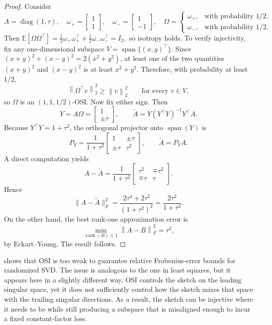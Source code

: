 \documentclass[onefignum,onetabnum]{siamart251216}
\newcommand{\E}{\mathbb{E}}
\newcommand{\norm}[1]{\left\lVert #1 \right\rVert}
\newcommand{\diag}{\operatorname{diag}}
\newcommand{\rank}{\operatorname{rank}}
\begin{document}
\begin{proof}
Consider
\[
A = \diag(1,\tau),
\quad
\omega_+ = \begin{bmatrix}1\\1\end{bmatrix},
\quad
\omega_- = \begin{bmatrix}1\\-1\end{bmatrix},
\quad
\Omega=
\begin{cases}
\omega_+, & \text{with probability } 1/2,\\
\omega_-, & \text{with probability } 1/2.
\end{cases}
\]
Then
$
\E[\Omega\Omega^\top] = \tfrac12\omega_+\omega_+^\top + \tfrac12\omega_-\omega_-^\top = I_2,
$
so isotropy holds. To verify injectivity, fix any one-dimensional subspace $V=\operatorname{span}\{(x,y)^\top\}$. Since $(x+y)^2 + (x-y)^2 = 2(x^2+y^2)$, at least one of the two quantities $(x+y)^2$ and $(x-y)^2$ is at least $x^2+y^2$. Therefore, with probability at least $1/2$,
\[
\norm{\Omega^\top v}_2^2 \ge \norm{v}_2^2
\qquad \text{for every } v\in V,
\]
so $\Omega$ is an $(1,1,1/2)$-OSI.  Now fix either sign. Then
\[
Y = A\Omega = \begin{bmatrix}1\\ \pm \tau\end{bmatrix},
\qquad
\widetilde A = Y(Y^\top Y)^{-1}Y^\top A.
\]
Because $Y^\top Y = 1+\tau^2$, the orthogonal projector onto $\operatorname{span}(Y)$ is
\[
P_Y = \frac{1}{1+\tau^2}
\begin{bmatrix}
1 & \pm \tau\\
\pm \tau & \tau^2
\end{bmatrix},
\qquad
\widetilde A = P_YA.
\]
A direct computation yields
\[
A-\widetilde A
=
\frac{1}{1+\tau^2}
\begin{bmatrix}
\tau^2 & \mp \tau^2\\
\mp \tau & \tau
\end{bmatrix}.
\]
Hence
\[
\|A-\widetilde A\|_F^2
=
\frac{2\tau^4+2\tau^2}{(1+\tau^2)^2}
=
\frac{2\tau^2}{1+\tau^2}.
\]
On the other hand, the best rank-one approximation error is
\[
\min_{\rank(B)\le 1}\norm{A-B}_F^2 = \tau^2,
\]
by Eckart--Young.  The result follows.
\end{proof}

 shows that OSI is too weak to guarantee relative Frobenius-error bounds for randomized SVD. The issue is analogous to the one in least squares,  but it appears here in a slightly different way.  OSI controls the sketch on the leading singular space,  yet it does not sufficiently control how the sketch mixes that space with the trailing singular directions.  As a result, the sketch can be injective where it needs to be while still producing a subspace that is misaligned enough to incur a fixed constant-factor loss.
\end{document}
